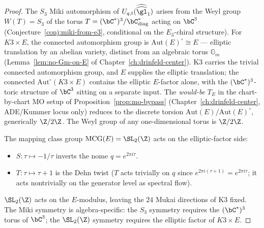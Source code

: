 \begin{proof}
The $S_3$ Miki automorphism of $U_{q, t}(\widehat{\widehat{\gl}}_1)$
arises from the Weyl group $W(T) = S_3$ of the torus
$T = (\bC^*)^3 / \bC^*_{\mathrm{diag}}$ acting on $\bC^3$
(Conjecture~\ref{conj:miki-from-e3}, conditional on the
$E_3$-chiral structure). For $K3 \times E$, the connected automorphism
group is $\mathrm{Aut}(E)^\circ \cong E$ — elliptic translation by
an abelian variety, distinct from an algebraic torus $\mathbb{G}_m$
(Lemma~\ref{lem:no-Gm-on-E} of
Chapter~\ref{ch:drinfeld-center}). K3 carries the trivial connected
automorphism group, and $E$ supplies the elliptic translation; the
connected $\mathrm{Aut}^\circ(K3 \times E)$ contains the elliptic
$E$-factor alone, with the $(\bC^*)^3$-toric structure of $\bC^3$
sitting on a separate input. The \emph{would-be} $T_E$ in the
chart-by-chart MO setup of Proposition~\ref{prop:mo-bypass}
(Chapter~\ref{ch:drinfeld-center}, ADE/Kummer locus only) reduces
to the discrete torsion $\mathrm{Aut}(E) / \mathrm{Aut}(E)^\circ$,
generically $\Z/2\Z$. The Weyl group of any one-dimensional torus is
$\Z/2\Z$.

The mapping class group $\mathrm{MCG}(E) = \SL_2(\Z)$ acts on the
elliptic-factor side:
\begin{itemize}
 \item $S \colon \tau \mapsto -1/\tau$ inverts the nome
 $q = e^{2\pi i \tau}$.
 \item $T \colon \tau \mapsto \tau + 1$ is the Dehn twist
 ($T$ acts trivially on $q$ since
 $e^{2\pi i(\tau + 1)} = e^{2\pi i \tau}$; it acts nontrivially on
 the generator level as spectral flow).
\end{itemize}
$\SL_2(\Z)$ acts on the $E$-modulus, leaving the $24$ Mukai
directions of K3 fixed. The Miki symmetry is algebra-specific: the
$S_3$ symmetry requires the $(\bC^*)^3$ torus of $\bC^3$; the
$\SL_2(\Z)$ symmetry requires the elliptic factor of $K3 \times E$.
\end{proof}

